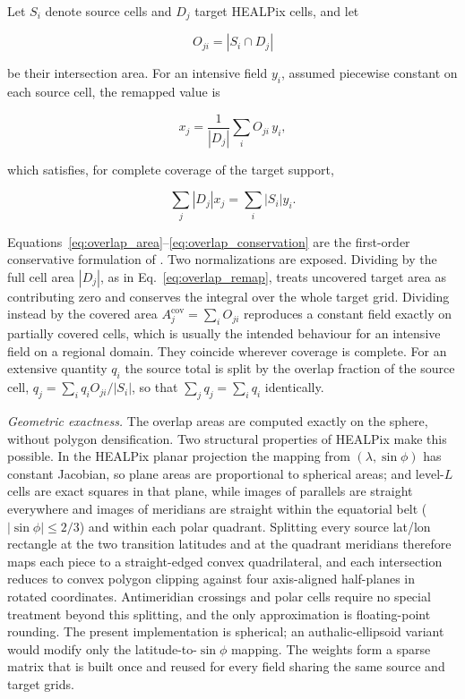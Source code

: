 \documentclass[journal]{IEEEtran}
\newcommand{\healpix}{HEALPix\xspace}
\begin{document}
Let $S_i$ denote source cells and $D_j$ target \healpix cells, and
let

\begin{equation}
O_{ji}=\left|S_i\cap D_j\right|
\label{eq:overlap_area}
\end{equation}

be their intersection area. For an intensive field $y_i$, assumed
piecewise constant on each source cell, the remapped value is

\begin{equation}
x_j=\frac{1}{\left|D_j\right|}\sum_i O_{ji}\,y_i ,
\label{eq:overlap_remap}
\end{equation}

which satisfies, for complete coverage of the target support,

\begin{equation}
\sum_j\left|D_j\right|x_j=\sum_i\left|S_i\right|y_i .
\label{eq:overlap_conservation}
\end{equation}

Equations~\eqref{eq:overlap_area}--\eqref{eq:overlap_conservation}
are the first-order conservative formulation of
\cite{jones1999scrip,hill2004esmf,zhuang2020xesmf}. Two
normalizations are exposed. Dividing by the full cell area
$\left|D_j\right|$, as in Eq.~\eqref{eq:overlap_remap}, treats
uncovered target area as contributing zero and conserves the
integral over the whole target grid. Dividing instead by the
covered area $A_j^{\mathrm{cov}}=\sum_i O_{ji}$ reproduces a
constant field exactly on partially covered cells, which is
usually the intended behaviour for an intensive field on a
regional domain. They coincide wherever coverage is complete. For
an extensive quantity $q_i$ the source total is split by the
overlap fraction of the source cell,
$q_j=\sum_i q_i O_{ji}/\left|S_i\right|$, so that
$\sum_j q_j=\sum_i q_i$ identically.

\emph{Geometric exactness.} The overlap areas are computed exactly
on the sphere, without polygon densification. Two structural
properties of \healpix \cite{gorski2005healpix} make this
possible. In the \healpix planar projection the mapping from
$(\lambda,\sin\phi)$ has constant Jacobian, so plane areas are
proportional to spherical areas; and level-$L$ cells are exact
squares in that plane, while images of parallels are straight
everywhere and images of meridians are straight within the
equatorial belt ($\left|\sin\phi\right|\le 2/3$) and within each
polar quadrant. Splitting every source lat/lon rectangle at the
two transition latitudes and at the quadrant meridians therefore
maps each piece to a straight-edged convex quadrilateral, and each
intersection reduces to convex polygon clipping against four
axis-aligned half-planes in rotated coordinates. Antimeridian
crossings and polar cells require no special treatment beyond this
splitting, and the only approximation is floating-point rounding.
The present implementation is spherical; an authalic-ellipsoid
variant would modify only the latitude-to-$\sin\phi$ mapping. The
weights form a sparse matrix that is built once and reused for
every field sharing the same source and target grids.
\end{document}
